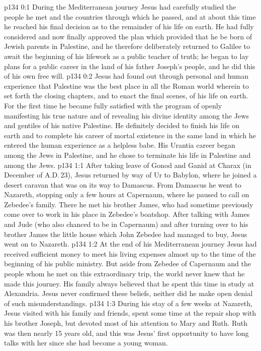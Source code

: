 \author{Midwayer Commission}
\vs p134 0:1 During the Mediterranean journey Jesus had carefully studied the people he met and the countries through which he passed, and at about this time he reached his final decision as to the remainder of his life on earth. He had fully considered and now finally approved the plan which provided that he be born of Jewish parents in Palestine, and he therefore deliberately returned to Galilee to await the beginning of his lifework as a public teacher of truth; he began to lay plans for a public career in the land of his father Joseph’s people, and he did this of his own free will.
\vs p134 0:2 Jesus had found out through personal and human experience that Palestine was the best place in all the Roman world wherein to set forth the closing chapters, and to enact the final scenes, of his life on earth. For the first time he became fully satisfied with the program of openly manifesting his true nature and of revealing his divine identity among the Jews and gentiles of his native Palestine. He definitely decided to finish his life on earth and to complete his career of mortal existence in the same land in which he entered the human experience as a helpless babe. His Urantia career began among the Jews in Palestine, and he chose to terminate his life in Palestine and among the Jews.
\vs p134 1:1 After taking leave of Gonod and Ganid at Charax (in December of A.D.\,23), Jesus returned by way of Ur to Babylon, where he joined a desert caravan that was on its way to Damascus. From Damascus he went to Nazareth, stopping only a few hours at Capernaum, where he paused to call on Zebedee’s family. There he met his brother James, who had sometime previously come over to work in his place in Zebedee’s boatshop. After talking with James and Jude (who also chanced to be in Capernaum) and after turning over to his brother James the little house which John Zebedee had managed to buy, Jesus went on to Nazareth.
\vs p134 1:2 At the end of his Mediterranean journey Jesus had received sufficient money to meet his living expenses almost up to the time of the beginning of his public ministry. But aside from Zebedee of Capernaum and the people whom he met on this extraordinary trip, the world never knew that he made this journey. His family always believed that he spent this time in study at Alexandria. Jesus never confirmed these beliefs, neither did he make open denial of such misunderstandings.
\vs p134 1:3 During his stay of a few weeks at Nazareth, Jesus visited with his family and friends, spent some time at the repair shop with his brother Joseph, but devoted most of his attention to Mary and Ruth. Ruth was then nearly 15 years old, and this was Jesus’ first opportunity to have long talks with her since she had become a young woman.
